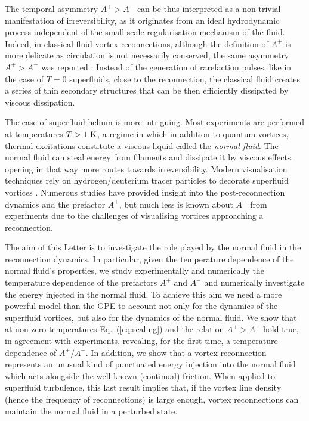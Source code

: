 \documentclass[%
 reprint,
 amsmath,amssymb,
 aps,
 prl,
]{revtex4-2}
\begin{document}
The temporal asymmetry $A^+>A^-$ can be thus interpreted as a non-trivial manifestation of irreversibility, as it originates from an ideal hydrodynamic process independent of the small-scale regularisation mechanism of the fluid.
%
Indeed, in classical fluid vortex reconnections, although the definition of $A^+$ is more delicate as circulation is not necessarily conserved, the same asymmetry $A^+>A^-$ was reported \cite{yaoSeparationScalingViscous2020}. Instead of the generation of rarefaction pulses, like in the case of $T=0$ superfluids, close to the reconnection, the classical fluid creates a series of thin secondary structures that can be then efficiently dissipated by viscous dissipation.

The case of superfluid helium is more intriguing. Most experiments are performed at temperatures $T>1~\rm K$, a regime in which in addition to quantum vortices, thermal excitations constitute a viscous liquid called the {\it normal fluid}. The normal fluid can steal energy from filaments and dissipate it by viscous effects, opening in that way more routes towards irreversibility. Modern visualisation techniques rely on hydrogen/deuterium tracer particles to decorate superfluid vortices \cite{paoletti2008velocity,bewley2008,guo2014visualization,perettiDirectVisualizationQuantum2023}. Numerous studies have provided insight into the post-reconnection dynamics and the prefactor $A^{+}$, but much less is known about $A^-$ from experiments due to the challenges of visualising vortices approaching a reconnection.

The aim of this Letter is to investigate the role played by the normal fluid in the reconnection dynamics. In particular, given the temperature dependence of the normal fluid's properties, we study experimentally and numerically the temperature dependence of the prefactors $A^+$ and $A^-$ and numerically investigate the energy injected in the normal fluid. 
%
To achieve this aim we need a more powerful model than the GPE to account not only for the dynamics of the
superfluid vortices, but also for the dynamics of the normal fluid. 
We show that at non-zero temperatures Eq.~(\ref{eq:scaling}) and the
relation $A^+>A^-$ hold true, in agreement with experiments, revealing, for the 
first time, a temperature dependence of $A^+/A^-$. In addition, we
show that a vortex
reconnection represents an unusual kind of
punctuated energy injection into the normal fluid which acts alongside
the well-known (continual) friction.
When applied to superfluid turbulence, this last result implies that,
if the vortex line density (hence the frequency of reconnections) 
is large enough, vortex
reconnections can maintain the normal fluid in a perturbed state.
\end{document}
